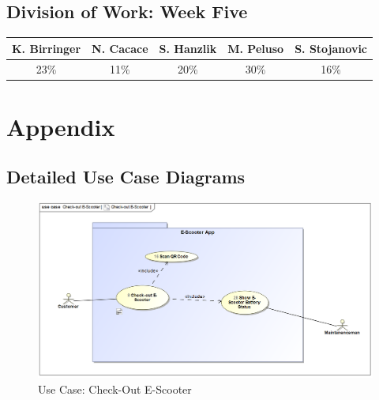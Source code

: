 \documentclass[a4paper, 12pt]{article}
\begin{document}
\subsection{Division of Work: Week Five}

\begin{table}[htbp]
\centering
\setlength{\tabcolsep}{10pt}
\begin{tabular}{|c|c|c|c|c|}
\hline
K. Birringer & N. Cacace & S. Hanzlik & M. Peluso & S. Stojanovic\\
\hline
23\%   &11\%  &20\%  &30\%  &16\%\\
\hline
\end{tabular}
\end{table}
\section{Appendix}


\subsection{Detailed Use Case Diagrams}
\begin{figure} [htbp]
  \begin{center}
    \includegraphics[scale=0.52]{images/UseCases/Check-OutE-Scooter.png}
  \end{center}
  \caption{Use Case: Check-Out E-Scooter}
\end{figure}
\end{document}
